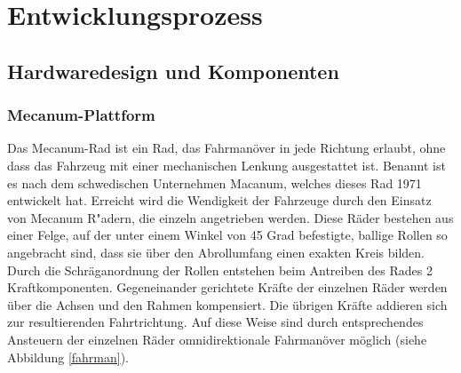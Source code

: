 \documentclass[a4paper,bibtotoc,oneside]{scrbook}
\begin{document}
\chapter{Entwicklungsprozess}\thispagestyle{empty}

\section{Hardwaredesign und Komponenten}\thispagestyle{empty}
\subsection{Mecanum-Plattform}\thispagestyle{empty}
Das Mecanum-Rad ist ein Rad, das Fahrmanöver in jede Richtung erlaubt, ohne dass das Fahrzeug mit einer mechanischen Lenkung ausgestattet ist. Benannt ist es nach dem schwedischen Unternehmen Macanum, welches dieses Rad 1971 entwickelt hat.
Erreicht wird die Wendigkeit der Fahrzeuge durch den Einsatz von Mecanum R"adern, die einzeln angetrieben werden. Diese Räder bestehen aus einer Felge, auf der unter einem Winkel von 45 Grad befestigte, ballige Rollen so angebracht sind, dass sie über den Abrollumfang einen exakten Kreis bilden.
Durch die Schräganordnung der Rollen entstehen beim Antreiben des Rades 2 Kraftkomponenten. Gegeneinander gerichtete Kräfte der einzelnen Räder werden über die Achsen und den Rahmen kompensiert. Die übrigen Kräfte addieren sich zur resultierenden Fahrtrichtung. Auf diese Weise sind durch entsprechendes Ansteuern der einzelnen Räder omnidirektionale Fahrmanöver möglich (siehe Abbildung \ref{fahrman}).
\end{document}
